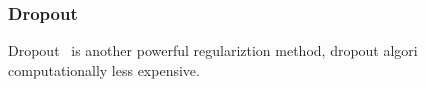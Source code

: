 \subsubsection{Dropout}

Dropout~\cite{JMLR:v15:srivastava14a} is another powerful regulariztion method, dropout algori computationally less expensive. 